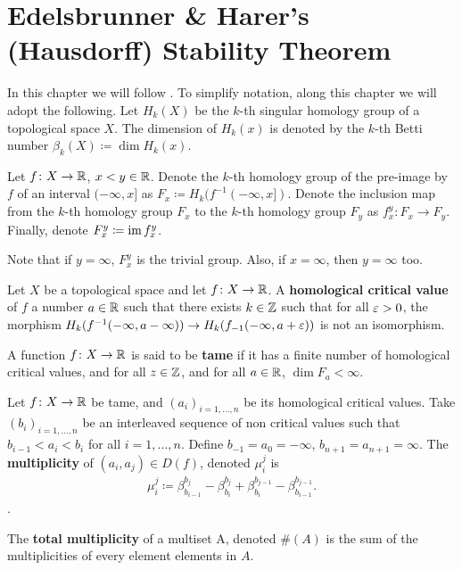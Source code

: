 \chapter{Edelsbrunner \& Harer's (Hausdorff) Stability Theorem}

In this chapter we will follow \cite{Edelsbrunner}. To simplify notation, along this chapter we will adopt the following. Let $ H_k(X) $ be the $k$-th singular homology group of a topological space $ X $. The dimension of $ H_k(x) $ is denoted by the $k$-th Betti number $ \beta_k(X) \coloneq \dim H_k(x) $.

Let $ f\colon X \to \mathbb R $, $x < y \in \mathbb R$. Denote the $k$-th homology group of the pre-image by $ f $ of an interval $ (-\infty, x] $ as $ F_x \coloneq H_k(f^{-1}(-\infty, x])$. Denote the inclusion map from the $k$-th homology group $ F_x$ to the  $k$-th homology group $ F_y$ as $f_x^y \colon F_x \to F_y $. Finally, denote $ F_x^y \coloneq \operatorname{im} f_x^y $.

Note that if $ y = \infty $, $ F_x^y $ is the trivial group. Also, if $ x = \infty $, then $ y = \infty $ too. 


\begin{definition}
    Let $ X $ be a topological space and let $ f\colon X \to \mathbb R $. A {\bf homological critical value} of $ f $ a number $ a \in \mathbb R $ such that there exists $k \in \mathbb Z$ such that for all 
    $ \varepsilon > 0 $, the morphism $ H_k(f^{-1}(-\infty, a - \infty)) \to H_k(f_{-1}(-\infty, a + \varepsilon)) $ is not an isomorphism.
\end{definition}

\begin{definition}
    A function $ f\colon X \to \mathbb R $ is said to be {\bf tame} if it has a finite number of homological critical values, and for all $ z \in \mathbb Z $, and for all $ a \in \mathbb R $, $ \dim F_a < \infty $.
\end{definition}

\begin{definition}[Multiplicity]
    Let $f \colon X \to \mathbb R $ be tame, and $ (a_i)_{i = 1, \dots, n} $ be its homological critical values. Take $ (b_i)_{i = 1, \dots, n} $ be an interleaved sequence of non critical values such that $ b_{i-1} < a_i < b_i $ for all $ i = 1, \dots, n $. Define $ b_{-1} = a_0 = -\infty $, $b_{n+1} = a_{n+1} = \infty $. The {\bf multiplicity} of $ (a_i, a_j) \in D(f) $, denoted $ \mu_i^j $ is
    \begin{align}
        \mu_i^j \coloneq \beta_{b_{i-1}}^{b_j} - \beta_{b_{i}}^{b_j} + \beta_{b_{i}}^{b_{j-1}} - \beta_{b_{i-1}}^{b_{j-1}}.
    \end{align}.

    The {\bf total multiplicity} of a multiset A, denoted $ \#(A) $ is the sum of the multiplicities of every element elements in $A$.
\end{definition}

